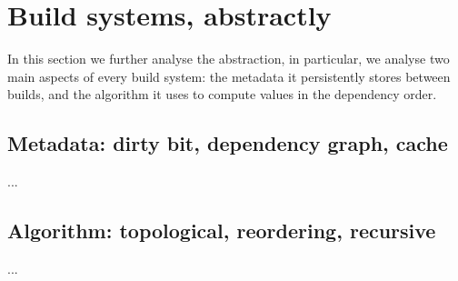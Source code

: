 \section{Build systems, abstractly}\label{sec-build}

In this section we further analyse the  abstraction, in
particular, we analyse two main aspects of every build system: the metadata
 it persistently stores between builds, and the algorithm it uses to
compute values in the dependency order.

\subsection{Metadata: dirty bit, dependency graph, cache}\label{sec-build-metadata}

...

\subsection{Algorithm: topological, reordering, recursive}\label{sec-build-algorithm}

...
